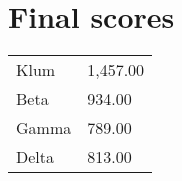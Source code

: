 \documentclass{article}
\begin{document}
\section*{Final scores}

\begin{center}
\begin{tabular}[t]{ll}
Klum & 1,457.00\\
Beta & 934.00\\
Gamma & 789.00\\
Delta & 813.00\\
\end{tabular}
\end{center}
\end{document}
